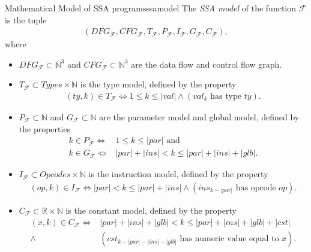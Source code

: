 \begin{definition}{Mathematical Model of SSA programs}{ssamodel}
    The {\em SSA model} of the function $\mathcal F$ is the tuple
    \begin{align*}
        (DFG_\mathcal{F},
         CFG_\mathcal{F},
         T_\mathcal{F},
         P_\mathcal{F},
         I_\mathcal{F},
         G_\mathcal{F},
         C_\mathcal{F}),
    \end{align*}
    where

    \begin{itemize}
    \item $DFG_\mathcal{F}\subset\mathbb N^3$ and
          $CFG_\mathcal{F}\subset\mathbb N^3$ are the data flow and control
          flow graph.
    \item $T_\mathcal F\subset Types\times\mathbb N$ is the type model, defined
          by the property
          \begin{align*}
              (ty,k)\in T_\mathcal F\iff 1\leq k\leq |val|
                  \mathrel{\land}(val_k\text{ has type }ty).
          \end{align*}
    \item $P_\mathcal F\subset\mathbb N$ and $G_\mathcal F\subset\mathbb N$
          are the parameter model and global model, defined by the properties
          \begin{align*}
              k\in P_\mathcal F\iff& 1\leq k\leq |par|\text{ and}\\
              k\in G_\mathcal F\iff& |par|+|ins|<k\leq |par|+|ins|+|glb|.
          \end{align*}
    \item $I_\mathcal F\subset Opcodes\times \mathbb N$ is the instruction model,
          defined by the property
          \begin{align*}
              (op,k)\in I_\mathcal F\iff |par|<k\leq |par|+|ins|
                  \mathrel{\land}(ins_{k-|par|}\text{ has opcode }op).
          \end{align*}
    \item $C_\mathcal F\subset\mathbb R\times\mathbb N$ is the constant model,
          defined by the property
          \begin{align*}
              (x,k)\in C_\mathcal F\iff{}&|par|+|ins|+|glb|<k\leq |par|+|ins|+|glb|+|cst|\\
                        \mathrel{\land}{}&(cst_{k-|par|-|ins|-|glb|}
                        \text{ has numeric value equal to }x).
          \end{align*}
    \end{itemize}
\end{definition}

